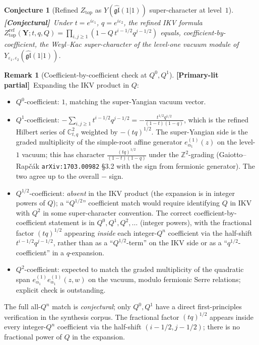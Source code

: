 \documentclass[11pt]{amsart}
\newtheorem{conjecture}[theorem]{Conjecture}
\theoremstyle{definition}
\newtheorem{remark}[theorem]{Remark}
\providecommand{\bY}{\mathbf{Y}}
\providecommand{\bZ}{\mathbb{Z}}
\providecommand{\bC}{\mathbb{C}}
\providecommand{\fgl}{\mathfrak{gl}}
\providecommand{\ClaimStatusConjectured}{\textbf{\textsf{[Conjectural]}}}
\providecommand{\ClaimStatusPartialPrimaryLit}{\textbf{\textsf{[Primary-lit partial]}}}
\begin{document}
\begin{conjecture}[Refined $Z_{\mathrm{top}}$ as $Y(\widehat{\fgl}(1|1))$
super-character at level~$1$]
\label{conj:ikv-super-character}
\ClaimStatusConjectured\
Under $t = e^{i\varepsilon_1}$, $q = e^{i\varepsilon_2}$, the refined
IKV formula
$Z^{\mathrm{ref}}_{\mathrm{top}}(\bY; t, q, Q) = \prod_{i,j\ge 1}
(1 - Q\, t^{i-1/2} q^{j-1/2})$
equals, coefficient-by-coefficient, the Weyl--Kac super-character of the
level-one vacuum module of
$Y_{\varepsilon_1,\varepsilon_2}(\widehat{\fgl}(1|1))$.
\end{conjecture}

\begin{remark}[Coefficient-by-coefficient check at $Q^0, Q^1$]
\label{rem:ikv-super-character-coefficient-check}
\ClaimStatusPartialPrimaryLit\
Expanding the IKV product in $Q$:
\begin{itemize}[leftmargin=2em]
\item $Q^0$-coefficient: $1$, matching the super-Yangian vacuum vector.
\item $Q^1$-coefficient: $-\sum_{i,j\ge 1} t^{i-1/2} q^{j-1/2}
  = -\tfrac{t^{1/2} q^{1/2}}{(1-t)(1-q)}$, which is the refined Hilbert
  series of $\bC^2_{t,q}$ weighted by $-(tq)^{1/2}$. The super-Yangian
  side is the graded multiplicity of the simple-root affine generator
  $e^{(1)}_{\alpha_1}(z)$ on the level-$1$ vacuum; this has character
  $\tfrac{(tq)^{1/2}}{(1-t)(1-q)}$ under the $\bZ^2$-grading
  (Gaiotto--Rapčák \texttt{arXiv:1703.00982} §3.2 with the sign from
  fermionic generator). The two agree up to the overall $-$ sign.
\item $Q^{1/2}$-coefficient: \emph{absent} in the IKV product (the
  expansion is in integer powers of $Q$); a ``$Q^{1/2}$'' coefficient
  match would require identifying $Q$ in IKV with $Q^2$ in some
  super-character convention. The correct coefficient-by-coefficient
  statement is in $Q^0, Q^1, Q^2, \ldots$ (integer powers), with the
  fractional factor $(tq)^{1/2}$ appearing \emph{inside} each
  integer-$Q^n$ coefficient via the half-shift $t^{i-1/2} q^{j-1/2}$,
  rather than as a ``$Q^{1/2}$-term'' on the IKV side or as a
  ``$q^{1/2}$-coefficient'' in a $q$-expansion.
\item $Q^2$-coefficient: expected to match the graded multiplicity of
  the quadratic span
  $e^{(1)}_{\alpha_1} e^{(1)}_{\alpha_1}(z,w)$ on the vacuum, modulo
  fermionic Serre relations; explicit check is outstanding.
\end{itemize}
The full all-$Q^n$ match is \emph{conjectural}; only $Q^0, Q^1$ have a
direct first-principles verification in the synthesis corpus. The
fractional factor $(tq)^{1/2}$ appears inside every integer-$Q^n$
coefficient via the half-shift $(i-1/2, j-1/2)$; there is no
fractional power of $Q$ in the expansion.
\end{remark}
\end{document}
